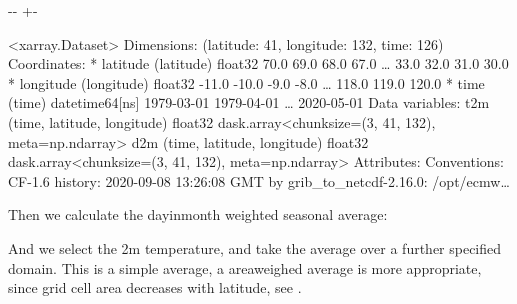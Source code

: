 \documentclass[letterpaper,10pt,english]{sphinxmanual}
\newlength\nbsphinxcodecellspacing
\begin{document}
{

\kern-\sphinxverbatimsmallskipamount\kern-\baselineskip
\kern+\FrameHeightAdjust\kern-\fboxrule
\vspace{\nbsphinxcodecellspacing}

\begin{sphinxVerbatim}[commandchars=\\\{\}]
\llap{\color{nbsphinxout}[5]:\,\hspace{\fboxrule}\hspace{\fboxsep}}<xarray.Dataset>
Dimensions:    (latitude: 41, longitude: 132, time: 126)
Coordinates:
  * latitude   (latitude) float32 70.0 69.0 68.0 67.0 {\ldots} 33.0 32.0 31.0 30.0
  * longitude  (longitude) float32 -11.0 -10.0 -9.0 -8.0 {\ldots} 118.0 119.0 120.0
  * time       (time) datetime64[ns] 1979-03-01 1979-04-01 {\ldots} 2020-05-01
Data variables:
    t2m        (time, latitude, longitude) float32 dask.array<chunksize=(3, 41, 132), meta=np.ndarray>
    d2m        (time, latitude, longitude) float32 dask.array<chunksize=(3, 41, 132), meta=np.ndarray>
Attributes:
    Conventions:  CF-1.6
    history:      2020-09-08 13:26:08 GMT by grib\_to\_netcdf-2.16.0: /opt/ecmw{\ldots}
\end{sphinxVerbatim}
}

Then we calculate the day\sphinxhyphen{}in\sphinxhyphen{}month weighted seasonal average:

{
\begin{sphinxVerbatim}[commandchars=\\\{\}]
\llap{\color{nbsphinxin}[6]:\,\hspace{\fboxrule}\hspace{\fboxsep}}     
     
\end{sphinxVerbatim}
}

And we select the 2m temperature, and take the average over a further specified domain. This is a simple average, a area\sphinxhyphen{}weighed average is more appropriate, since grid cell area decreases with latitude, see {\hyperref[\detokenize{Notebooks/2.Preprocess/2.Preprocess::doc}]{}}.
\end{document}

